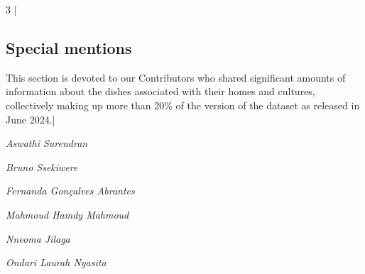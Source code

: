 \setlength{\columnsep}{0.5cm}
\begin{multicols}{3}
[
\subsection{Special mentions}
This section is devoted to our Contributors who shared significant amounts of information about the dishes associated with their homes and cultures, collectively making up more than 20\% of the version of the dataset as released in June 2024.] 

\textit{Aswathi Surendran}

\textit{Bruno Ssekiwere}

\textit{Fernanda Gonçalves Abrantes}

\textit{Mahmoud Hamdy Mahmoud}

\textit{Nneoma Jilaga}

\textit{Ondari Laurah Nyasita}


\end{multicols}
\setlength{\columnsep}{0.5cm}
